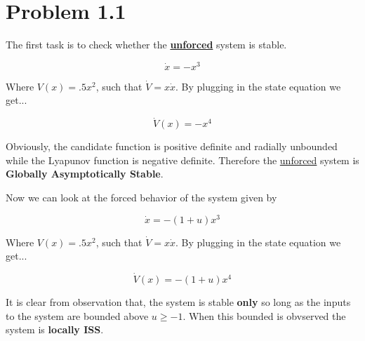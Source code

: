 \section*{Problem 1.1}


The first task is to check whether the \textbf{\underline{unforced}} system is stable.

$$
\dot{x} = -x^3
$$

\noindent Where $V(x) = .5x^2$, such that $\dot{V} = x\dot{x}$. By plugging in the state equation we get...

$$
\dot{V}(x) = -x^4
$$

\noindent Obviously, the candidate function is positive definite and radially unbounded while the Lyapunov function is negative definite. Therefore the \underline{unforced} system is \textbf{Globally Asymptotically Stable}.

\noindent Now we can look at the forced behavior of the system given by


$$
\dot{x} = -(1 + u)x^3
$$

\noindent Where $V(x) = .5x^2$, such that $\dot{V} = x\dot{x}$. By plugging in the state equation we get...

$$
\dot{V}(x) = -(1 + u)x^4
$$

\noindent It is clear from observation that, the system is stable \textbf{only} so long as the inputs to the system are bounded above $u \geq -1$. When this bounded is obvserved the system is \textbf{locally ISS}. 
